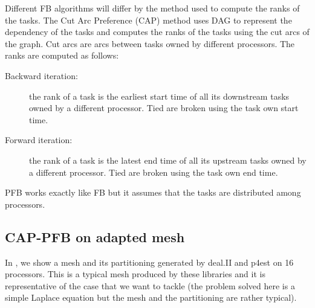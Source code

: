 \documentclass{mc2015}
\renewcommand{\(}{\left(}
\renewcommand{\)}{\right)}
\renewcommand{\[}{\left[}
\renewcommand{\]}{\right]}
\begin{document}
Different FB algorithms will differ by the method used to compute the ranks of the tasks. The
Cut Arc Preference (CAP) method uses DAG to represent the dependency of the
tasks and computes the ranks of the tasks using the cut arcs of the graph. Cut
arcs are arcs between tasks owned by different processors. The ranks are
computed as follows:
\begin{description}
  \item[Backward iteration:] the rank of a task is the earliest start time of all its downstream tasks
    owned by a different processor. Tied are broken using the task own start time.
  \item[Forward iteration:] the rank of a task is the latest end time of all its upstream tasks owned
    by a different processor. Tied are broken using the task own end time.
\end{description}
PFB works exactly like FB but it assumes that the tasks are distributed among processors.

\subsection{CAP-PFB on adapted mesh}

In , we show a mesh and its partitioning generated by deal.II and p4est 
on 16 processors. This is a typical mesh produced by these libraries and it is
representative of the case that we want to tackle (the problem solved here is a
simple Laplace equation but the mesh and the partitioning are rather typical). 
\end{document}
